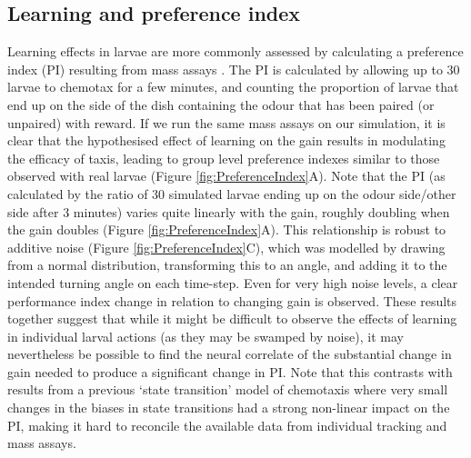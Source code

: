 \documentclass[11pt,a4paper]{article}
\begin{document}

\subsection{Learning and preference index}
Learning effects in larvae are more commonly assessed by calculating a preference index (PI) resulting from mass assays \citep{gerber2009smelling}. The PI is calculated by allowing up to 30 larvae to chemotax for a few minutes, and counting the proportion of larvae that end up on the side of the dish containing the odour that has been paired (or unpaired) with reward. If we run the same mass assays on our simulation, it is clear that the hypothesised effect of learning on the gain results in modulating the efficacy of taxis, leading to group level preference indexes similar to those observed with real larvae (Figure \ref{fig:PreferenceIndex}A). Note that the PI (as calculated by the ratio of 30 simulated larvae ending up on the odour side/other side after 3 minutes) varies quite linearly with the gain, roughly doubling when the gain doubles (Figure \ref{fig:PreferenceIndex}A).
 This relationship is robust to additive noise (Figure \ref{fig:PreferenceIndex}C), which was modelled by drawing from a normal distribution, transforming this to an angle, and adding it to the intended turning angle on each time-step.
  Even for very high noise levels, a clear performance index change in relation to changing gain is observed. These results together suggest that while it might be difficult to observe the effects of learning in individual larval actions (as they may be swamped by noise), it may nevertheless be possible to find the neural correlate of the substantial change in gain needed to produce a significant change in PI.
Note that this contrasts with results from a previous `state transition' model of chemotaxis \citep{davies2015model} where very small changes in the biases in state transitions had a strong non-linear impact on the PI, making it hard to reconcile the available data from individual tracking and mass assays.
\end{document}
